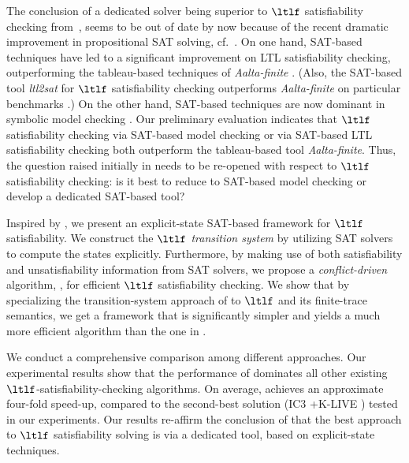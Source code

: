 The conclusion of a dedicated solver being superior to $\ltlf$ satisfiability checking from~\cite{LZPVH14}, seems to be out of date by now because of the recent dramatic improvement in propositional SAT solving, cf.~\cite{MZ09}. On one hand, SAT-based techniques have led to a significant improvement on LTL satisfiability checking, outperforming the tableau-based techniques of \emph{Aalta-finite} \cite{LZPVH14}. (Also, the SAT-based tool \emph{ltl2sat} for $\ltlf$ satisfiability checking outperforms \emph{Aalta-finite} on particular benchmarks \cite{FG16}.) On the other hand, SAT-based techniques are now dominant in symbolic model checking \cite{CCDGMMMRT14,VWM15}. Our preliminary evaluation indicates that $\ltlf$ satisfiability checking via SAT-based model checking  \cite{Bra11,EMB11} or via SAT-based LTL satisfiability checking \cite{LZPV15} both outperform the tableau-based tool \emph{Aalta-finite}.
Thus, the question raised initially in \cite{RV07} needs to be re-opened with respect to $\ltlf$ satisfiability checking: is it best to reduce to SAT-based model checking or develop a dedicated SAT-based tool?

Inspired by \cite{LZPV15}, we present an explicit-state SAT-based framework for $\ltlf$ satisfiability. We construct the \emph{$\ltlf$ transition system} by utilizing SAT solvers to compute the states explicitly. Furthermore, by making use of both satisfiability and unsatisfiability information from SAT solvers, we propose a \emph{conflict-driven} algorithm, \cdlsc, for efficient $\ltlf$ satisfiability checking. We show that by specializing the transition-system approach of \cite{LZPV15} to $\ltlf$ and its finite-trace semantics, we get a framework that is significantly simpler and yields a much more efficient algorithm \cdlsc than the one in \cite{LZPV15}.

We conduct a comprehensive comparison among different approaches. 
Our experimental results show that the performance of \cdlsc dominates all other existing $\ltlf$-satisfiability-checking algorithms. On average, \cdlsc achieves an approximate four-fold speed-up, compared to the second-best solution (IC3 \cite{Bra11}+K-LIVE \cite{CS12}) tested in our experiments. Our results re-affirm the conclusion of \cite{LZPVH14} that the best approach to $\ltlf$ satisfiability solving is via a dedicated tool, based on explicit-state techniques.


